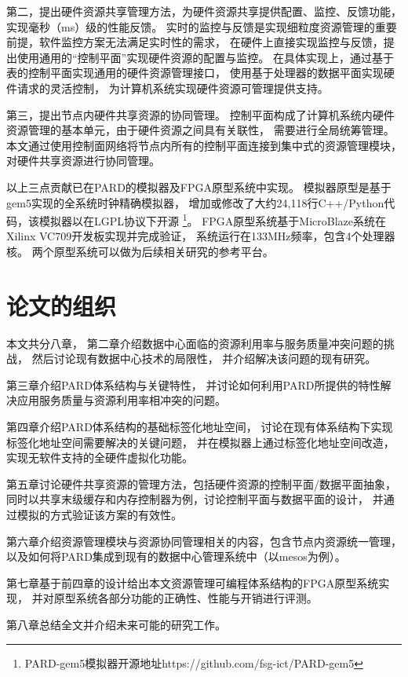 第二，提出硬件资源共享管理方法，为硬件资源共享提供配置、监控、反馈功能，
实现毫秒（ms）级的性能反馈。
实时的监控与反馈是实现细粒度资源管理的重要前提，软件监控方案无法满足实时性的需求，
在硬件上直接实现监控与反馈，提出使用通用的``控制平面''实现硬件资源的配置与监控。
在具体实现上，通过基于表的控制平面实现通用的硬件资源管理接口，
使用基于处理器的数据平面实现硬件请求的灵活控制，
为计算机系统实现硬件资源可管理提供支持。

第三，提出节点内硬件共享资源的协同管理。
控制平面构成了计算机系统内硬件资源管理的基本单元，由于硬件资源之间具有关联性，
需要进行全局统筹管理。
本文通过使用控制面网络将节点内所有的控制平面连接到集中式的资源管理模块，
对硬件共享资源进行协同管理。

以上三点贡献已在PARD的模拟器及FPGA原型系统中实现。
模拟器原型是基于gem5\cite{binkert_gem5_2011}实现的全系统时钟精确模拟器，
增加或修改了大约24,118行C++/Python代码，该模拟器以在LGPL协议下开源
\footnote{PARD-gem5模拟器开源地址https://github.com/fsg-ict/PARD-gem5}。
FPGA原型系统基于MicroBlaze系统在Xilinx VC709开发板实现并完成验证，
系统运行在133MHz频率，包含4个处理器核。
两个原型系统可以做为后续相关研究的参考平台。


\section{论文的组织}

本文共分八章，
第二章介绍数据中心面临的资源利用率与服务质量冲突问题的挑战，
然后讨论现有数据中心技术的局限性，
并介绍解决该问题的现有研究。

第三章介绍PARD体系结构与关键特性，
并讨论如何利用PARD所提供的特性解决应用服务质量与资源利用率相冲突的问题。

第四章介绍PARD体系结构的基础标签化地址空间，
讨论在现有体系结构下实现标签化地址空间需要解决的关键问题，
并在模拟器上通过标签化地址空间改造，实现无软件支持的全硬件虚拟化功能。

第五章讨论硬件共享资源的管理方法，包括硬件资源的控制平面/数据平面抽象，
同时以共享末级缓存和内存控制器为例，讨论控制平面与数据平面的设计，
并通过模拟的方式验证该方案的有效性。

第六章介绍资源管理模块与资源协同管理相关的内容，包含节点内资源统一管理，
以及如何将PARD集成到现有的数据中心管理系统中（以mesos\cite{Hindman:2011:Mesos}为例）。

第七章基于前四章的设计给出本文资源管理可编程体系结构的FPGA原型系统实现，
并对原型系统各部分功能的正确性、性能与开销进行评测。

第八章总结全文并介绍未来可能的研究工作。

